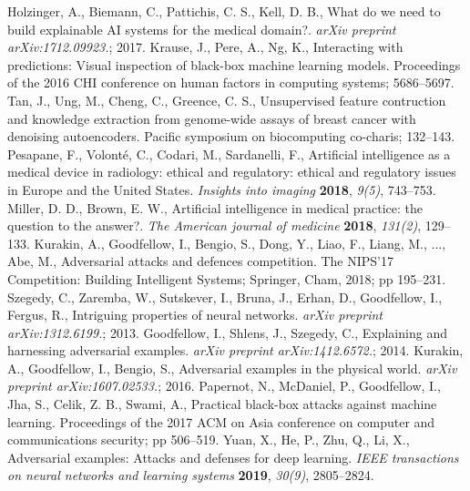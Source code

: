 \documentclass[journal,article,submit,moreauthors,pdftex]{Definitions/mdpi}
\begin{document}
\begin{thebibliography}{999}
Holzinger, A., Biemann, C., Pattichis, C. S., Kell, D. B., What do we need to build explainable AI systems for the medical domain?. \textit{arXiv preprint arXiv:1712.09923.}; 2017.
Krause, J., Pere, A., Ng, K., Interacting with predictions: Visual inspection of black-box machine learning models. Proceedings of the 2016 CHI conference on human factors in computing systems; 5686--5697.
Tan, J., Ung, M., Cheng, C., Greence, C. S., Unsupervised feature contruction and knowledge extraction from genome-wide assays of breast cancer with denoising autoencoders. Pacific symposium on biocomputing co-charis; 132--143.
Pesapane, F., Volonté, C., Codari, M., Sardanelli, F., Artificial intelligence as a medical device in radiology: ethical and regulatory: ethical and regulatory issues in Europe and the United States. {\em Insights into imaging} {\bf 2018}, {\em 9(5)}, 743--753.
Miller, D. D., Brown, E. W., Artificial intelligence in medical practice: the question to the answer?. {\em The American journal of medicine} {\bf 2018}, {\em 131(2)}, 129--133.
Kurakin, A., Goodfellow, I., Bengio, S., Dong, Y., Liao, F., Liang, M., ..., Abe, M., Adversarial attacks and defences competition. The NIPS'17 Competition: Building Intelligent Systems; Springer, Cham, 2018; pp 195--231.
Szegedy, C., Zaremba, W., Sutskever, I., Bruna, J., Erhan, D., Goodfellow, I., Fergus, R., Intriguing properties of neural networks. \textit{arXiv preprint arXiv:1312.6199.}; 2013.
Goodfellow, I., Shlens, J., Szegedy, C., Explaining and harnessing adversarial examples. \textit{arXiv preprint arXiv:1412.6572.}; 2014.
Kurakin, A., Goodfellow, I., Bengio, S., Adversarial examples in the physical world. \textit{arXiv preprint arXiv:1607.02533.}; 2016.
Papernot, N., McDaniel, P., Goodfellow, I., Jha, S., Celik, Z. B., Swami, A., Practical black-box attacks against machine learning. Proceedings of the 2017 ACM on Asia conference on computer and communications security; pp 506--519.
Yuan, X., He, P., Zhu, Q., Li, X., Adversarial examples: Attacks and defenses for deep learning. {\em IEEE transactions on neural networks and learning systems} {\bf 2019}, {\em 30(9)}, 2805--2824.

\end{thebibliography}
\end{document}
